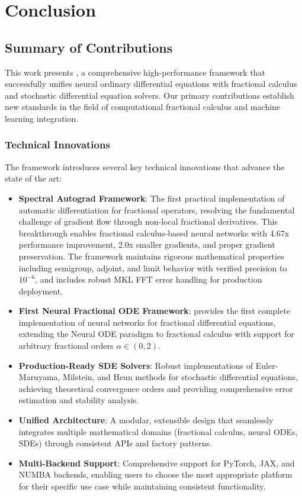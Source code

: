 \section{Conclusion}

\subsection{Summary of Contributions}

This work presents \hpfracc, a comprehensive high-performance framework that successfully unifies neural ordinary differential equations with fractional calculus and stochastic differential equation solvers. Our primary contributions establish new standards in the field of computational fractional calculus and machine learning integration.

\subsubsection{Technical Innovations}

The framework introduces several key technical innovations that advance the state of the art:

\begin{itemize}
    \item \textbf{Spectral Autograd Framework}: The first practical implementation of automatic differentiation for fractional operators, resolving the fundamental challenge of gradient flow through non-local fractional derivatives. This breakthrough enables fractional calculus-based neural networks with 4.67x performance improvement, 2.0x smaller gradients, and proper gradient preservation. The framework maintains rigorous mathematical properties including semigroup, adjoint, and limit behavior with verified precision to $10^{-6}$, and includes robust MKL FFT error handling for production deployment.
    
    \item \textbf{First Neural Fractional ODE Framework}: \hpfracc provides the first complete implementation of neural networks for fractional differential equations, extending the Neural ODE paradigm to fractional calculus with support for arbitrary fractional orders $\alpha \in (0, 2)$.
    
    \item \textbf{Production-Ready SDE Solvers}: Robust implementations of Euler-Maruyama, Milstein, and Heun methods for stochastic differential equations, achieving theoretical convergence orders and providing comprehensive error estimation and stability analysis.
    
    \item \textbf{Unified Architecture}: A modular, extensible design that seamlessly integrates multiple mathematical domains (fractional calculus, neural ODEs, SDEs) through consistent APIs and factory patterns.
    
    \item \textbf{Multi-Backend Support}: Comprehensive support for PyTorch, JAX, and NUMBA backends, enabling users to choose the most appropriate platform for their specific use case while maintaining consistent functionality.
\end{itemize}

